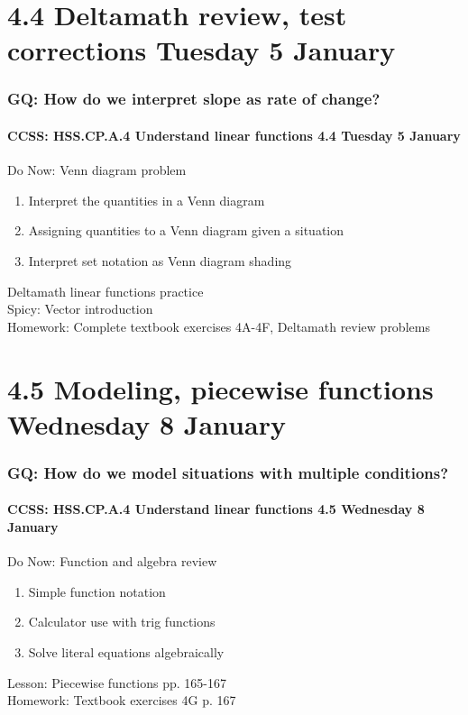 \documentclass{beamer}
\begin{document}
\section{4.4 Deltamath review, test corrections Tuesday 5 January}
\frame
{
  \frametitle{GQ: How do we interpret slope as rate of change?}
  \framesubtitle{CCSS: HSS.CP.A.4 Understand linear functions \hfill \alert{4.4 Tuesday 5 January}}

  \begin{block}{Do Now: Venn diagram problem}
  \begin{enumerate}
    \item Interpret the quantities in a Venn diagram
    \item Assigning quantities to a Venn diagram given a situation
    \item Interpret set notation as Venn diagram shading
  \end{enumerate}
  \end{block}
  Deltamath linear functions practice \\ \bigskip
  Spicy: Vector introduction \\ \smallskip
  Homework: Complete textbook exercises 4A-4F, Deltamath review problems
}

\section{4.5 Modeling, piecewise functions Wednesday 8 January}
\frame
{
  \frametitle{GQ: How do we model situations with multiple conditions?}
  \framesubtitle{CCSS: HSS.CP.A.4 Understand linear functions \hfill \alert{4.5 Wednesday 8 January}}

  \begin{block}{Do Now: Function and algebra review}
  \begin{enumerate}
      \item Simple function notation
      \item Calculator use with trig functions
      \item Solve literal equations algebraically 
  \end{enumerate}
  \end{block}
  Lesson: Piecewise functions pp. 165-167 \\ \smallskip
  Homework: Textbook exercises 4G p. 167
}
\end{document}
